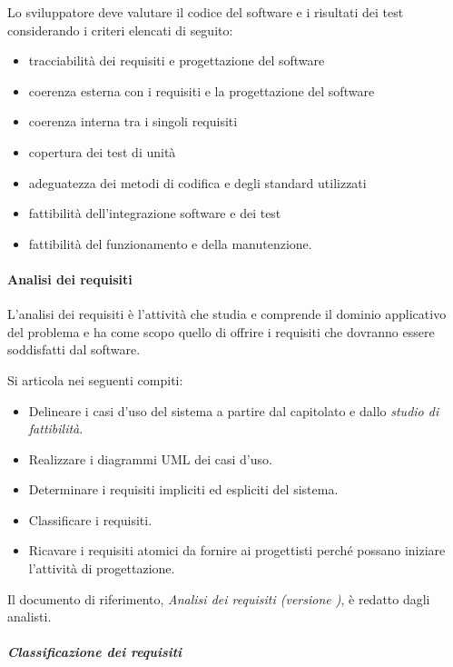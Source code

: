 \documentclass[../../norme-di-progetto.tex]{subfiles}
\begin{document}
Lo sviluppatore deve valutare il codice del software e i risultati dei test considerando i criteri elencati di seguito:

\begin{itemize}
  \item tracciabilità dei requisiti e progettazione del software
  \item coerenza esterna con i requisiti e la progettazione del software
  \item coerenza interna tra i singoli requisiti
  \item copertura dei test di unità
  \item adeguatezza dei metodi di codifica e degli standard utilizzati
  \item fattibilità dell'integrazione software e dei test
  \item fattibilità del funzionamento e della manutenzione.
\end{itemize}

\paragraph{Analisi dei requisiti}%
\label{par:analisi_dei_requisiti}
L'analisi dei requisiti è l'attività che studia e comprende il dominio applicativo del problema e ha come scopo quello di offrire i requisiti che dovranno essere soddisfatti dal software.

Si articola nei seguenti compiti:

\begin{itemize}
  \item Delineare i casi d'uso del sistema a partire dal capitolato e dallo \textit{studio di fattibilità}.
  \item Realizzare i diagrammi UML dei casi d'uso.
  \item Determinare i requisiti impliciti ed espliciti del sistema.
  \item Classificare i requisiti.
  \item Ricavare i requisiti atomici da fornire ai progettisti perché possano iniziare l'attività di progettazione.
\end{itemize}

Il documento di riferimento, \textit{Analisi dei requisiti (versione \versione)}, è redatto dagli analisti.

\subparagraph{Classificazione dei requisiti}%
\label{subp:classificazione_dei_requisiti}
\end{document}
